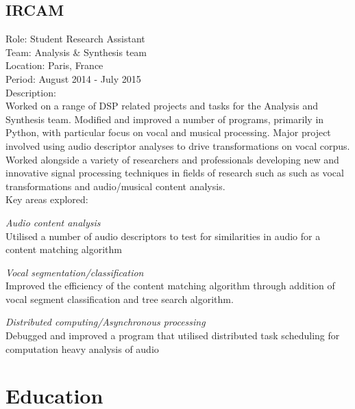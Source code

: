 \documentclass[10pt,letterpaper]{article}
\renewenvironment{itemize}{
  \begin{list}{}{
    \setlength{\leftmargin}{1.5em}
    \setlength{\itemsep}{0.25em}
    \setlength{\parskip}{0pt}
    \setlength{\parsep}{0.25em}
  }
}{
  \end{list}
}
\begin{document}
\subsection*{IRCAM}
    Role: Student Research Assistant \\
    Team: Analysis \& Synthesis team \\
    Location: Paris, France \\
    Period: August 2014 - July 2015 \\
    \newline
    Description: \\
    Worked on a range of DSP related projects and tasks for the Analysis and
    Synthesis team. Modified and improved a number of programs, primarily in
    Python, with particular focus on vocal and musical processing.  Major
    project involved using audio descriptor analyses to drive transformations
    on vocal corpus. Worked alongside a variety of researchers and
    professionals developing new and innovative signal processing techniques in
    fields of research such as such as vocal transformations and audio/musical
    content analysis. \\
    \newline
    Key areas explored:
    \begin{itemize}
        \item \textit{Audio content analysis}\\
            Utilised a number of audio descriptors to test for similarities in
            audio for a content matching algorithm
        \item \textit{Vocal segmentation/classification}\\
            Improved the efficiency of the content matching algorithm through
            addition of vocal segment classification and tree search algorithm.
        \item \textit{Distributed computing/Asynchronous processing}\\
            Debugged and improved a program that utilised distributed task
            scheduling for computation heavy analysis of audio
    \end{itemize}

\newpage

\section*{Education}
\end{document}
